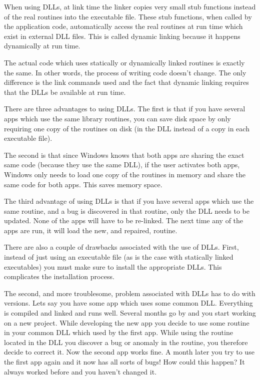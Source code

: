 When using DLLs, at link time the linker copies very small stub
functions instead of the real routines into the executable file.  These
stub functions, when called by the application code, automatically
access the real routines at run time which exist in external DLL files.
This is called dynamic linking because it happens dynamically at run time.

The actual code which uses statically or dynamically linked routines is
exactly the same.  In other words, the process of writing code doesn't
change.  The only difference is the link commands used and the fact that
dynamic linking requires that the DLLs be available at run time.

There are three advantages to using DLLs.  The first is that if you have
several apps which use the same library routines, you can save disk
space by only requiring one copy of the routines on disk (in the DLL
instead of a copy in each executable file).

The second is that since Windows knows that both apps are sharing the
exact same code (because they use the same DLL), if the user activates
both apps, Windows only needs to load one copy of the routines in memory
and share the same code for both apps.  This saves memory space.

The third advantage of using DLLs is that if you have several apps which
use the same routine, and a bug is discovered in that routine, only the
DLL needs to be updated.  None of the apps will have to be re-linked.
The next time any of the apps are run, it will load the new, and repaired,
routine.

There are also a couple of drawbacks associated with the use of DLLs.
First, instead of just using an executable file (as is the case with
statically linked executables) you must make sure to install the appropriate
DLLs.  This complicates the installation process.

The second, and more troublesome, problem associated with DLLs has to do
with versions.  Lets say you have some app which uses some common DLL.
Everything is compiled and linked and runs well.  Several months go by
and you start working on a new project.  While developing the new app
you decide to use some routine in your common DLL which used by the
first app.  While using the routine located in the DLL you discover a
bug or anomaly in the routine, you therefore decide to correct it.
Now the second app works fine.  A month later you try to use the first
app again and it now has all sorts of bugs!  How could this happen?
It always worked before and you haven't changed it.

